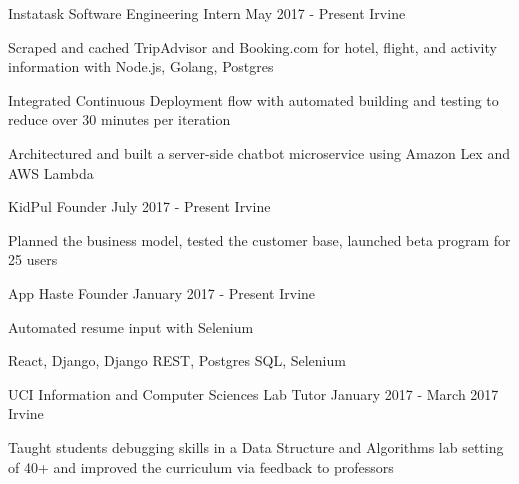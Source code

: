 

\begin{cventries}
	
	\cventry
	{Instatask} %
	{Software Engineering Intern} %
	{May 2017 - Present} %
	{Irvine} %
	{
		\begin{cvitems}
			\item Scraped and cached TripAdvisor and Booking.com for hotel, flight, and activity information with Node.js, Golang, Postgres
			\item Integrated Continuous Deployment flow with automated building and testing to reduce over 30 minutes per iteration
			\item Architectured and built a server-side chatbot microservice using Amazon Lex and AWS Lambda
		\end{cvitems}
	}
	
	\cventry
	{KidPul} %
	{Founder} %
	{July 2017 - Present} %
	{Irvine} %
	{
		\begin{cvitems}
			\item Planned the business model, tested the customer base, launched beta program for 25 users
		\end{cvitems}
	}
	
	\cventry
		{App Haste} %
		{Founder} %
		{January 2017 - Present} %
		{Irvine} %
		{
			\begin{cvitems}
				\item Automated resume input with Selenium
				\item React, Django, Django REST, Postgres SQL, Selenium
			\end{cvitems}
		}

  \cventry
    {UCI Information and Computer Sciences} %
    {Lab Tutor} %
    {January 2017 - March 2017} %
    {Irvine} %
    {
      \begin{cvitems}
      	\item Taught students debugging skills in a Data Structure and Algorithms lab setting of 40+ and improved the curriculum via feedback to professors
      \end{cvitems}
    }


\end{cventries}
